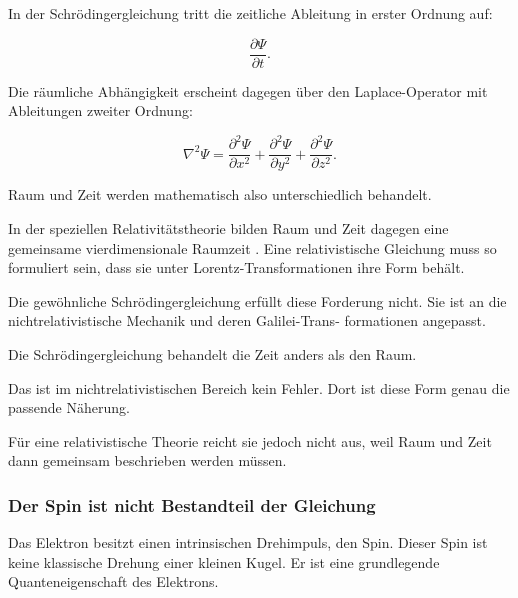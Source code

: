 In der Schrödingergleichung tritt die zeitliche Ableitung in erster
Ordnung auf:

\begin{equation}
	\frac{\partial\Psi}{\partial t}.
\end{equation}

Die räumliche Abhängigkeit erscheint dagegen über den
Laplace-Operator mit Ableitungen zweiter
Ordnung:

\begin{equation}
	\nabla^2\Psi
	=
	\frac{\partial^2\Psi}{\partial x^2}
	+
	\frac{\partial^2\Psi}{\partial y^2}
	+
	\frac{\partial^2\Psi}{\partial z^2}.
\end{equation}

Raum und Zeit werden mathematisch also unterschiedlich behandelt.

In der speziellen Relativitätstheorie bilden Raum und Zeit dagegen
eine gemeinsame vierdimensionale Raumzeit%
. Eine relativistische Gleichung muss so formuliert
sein, dass sie unter Lorentz-Transformationen%
 ihre Form behält.

Die gewöhnliche Schrödingergleichung erfüllt diese Forderung nicht. Sie
ist an die nichtrelativistische Mechanik und deren
Galilei-Trans- \newline formationen%
 angepasst.

\begin{DidacticBox}
	\label{box:raum_zeit_schroedinger}
	
	Die Schrödingergleichung behandelt die Zeit anders als den Raum.
	
	Das ist im nichtrelativistischen Bereich kein Fehler. Dort ist diese
	Form genau die passende Näherung.
	
	Für eine relativistische Theorie reicht sie jedoch nicht aus, weil
	Raum und Zeit dann gemeinsam beschrieben werden müssen.
\end{DidacticBox}

\subsubsection*{Der Spin ist nicht Bestandteil der Gleichung}

Das Elektron besitzt einen intrinsischen Drehimpuls, den
Spin. Dieser Spin ist keine klassische Drehung
einer kleinen Kugel. Er ist eine grundlegende Quanteneigenschaft des
Elektrons.

